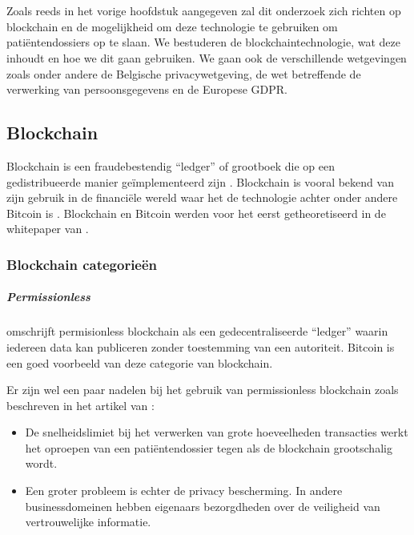 \chapter{}
\label{ch:stand-van-zaken}

Zoals reeds in het vorige hoofdstuk aangegeven zal dit onderzoek zich richten op blockchain en de mogelijkheid om deze technologie te gebruiken om patiëntendossiers op te slaan. We bestuderen de blockchaintechnologie, wat deze inhoudt en hoe we dit gaan gebruiken. We gaan ook de verschillende wetgevingen zoals onder andere de Belgische privacywetgeving, de wet betreffende de verwerking van persoonsgegevens en de Europese GDPR.
\section{Blockchain}
\label{ch:blockchain}

Blockchain is een fraudebestendig ``ledger'' of grootboek die op een gedistribueerde manier geïmplementeerd zijn \autocite{Yaga2018}. Blockchain is vooral bekend van zijn gebruik in de financiële wereld waar het de technologie achter onder andere Bitcoin is \autocite{Nofer2017}. Blockchain en Bitcoin werden voor het eerst getheoretiseerd in de whitepaper van \textcite{Nakamoto2008}. 

\subsection{Blockchain categorieën}

\paragraph{Permissionless}

\textcite{Yaga2018} omschrijft permisionless blockchain als een gedecentraliseerde ``ledger'' waarin iedereen data kan publiceren zonder toestemming van een autoriteit. Bitcoin is een goed voorbeeld van deze categorie van blockchain.

Er zijn wel een paar nadelen bij het gebruik van permissionless blockchain zoals beschreven in het artikel van \textcite{Liu}:
\begin{itemize}
    \item De snelheidslimiet bij het verwerken van grote hoeveelheden transacties werkt het oproepen van een patiëntendossier tegen als de blockchain grootschalig wordt.
    \item Een groter probleem is echter de privacy bescherming. In andere businessdomeinen hebben eigenaars bezorgdheden over de veiligheid van vertrouwelijke informatie.
\end{itemize}


